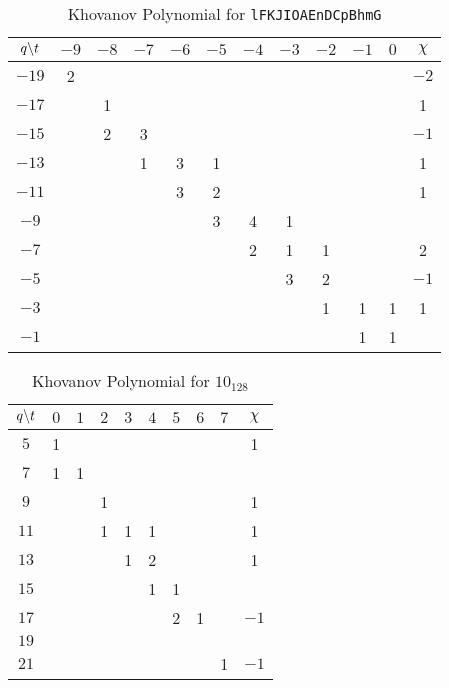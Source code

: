 \begin{table}
    \centering
    \begin{tabular}{| c | c |c | c | c | c | c | c | c | c | c | c |}
        \hline
        $q\symbol{92}t$&$-9$&$-8$&$-7$&$-6$&$-5$&$-4$&$-3$&$-2$&$-1$&$0$&$\chi$\\
        \hline
        $-19$&2&&&&&&&&&&$-2$\\
        \hline
        $-17$&&1&&&&&&&&&1\\
        \hline
        $-15$&&2&3&&&&&&&&$-1$\\
        \hline
        $-13$&&&1&3&1&&&&&&1\\
        \hline
        $-11$&&&&3&2&&&&&&1\\
        \hline
        $-9$&&&&&3&4&1&&&&\\
        \hline
        $-7$&&&&&&2&1&1&&&2\\
        \hline
        $-5$&&&&&&&3&2&&&$-1$\\
        \hline
        $-3$&&&&&&&&1&1&1&1\\
        \hline
        $-1$&&&&&&&&&1&1&\\
        \hline
    \end{tabular}
    \caption{Khovanov Polynomial for \texttt{lFKJIOAEnDCpBhmG}}
\end{table}
\begin{table}
    \centering
    \begin{tabular}{| c | c | c | c | c | c | c | c | c | c |}
        \hline
        $q\symbol{92}t$&$0$&$1$&$2$&$3$&$4$&$5$&$6$&$7$&$\chi$\\
        \hline
        $5$&1&&&&&&&&1\\
        \hline
        $7$&1&1&&&&&&&\\
        \hline
        $9$&&&1&&&&&&1\\
        \hline
        $11$&&&1&1&1&&&&1\\
        \hline
        $13$&&&&1&2&&&&1\\
        \hline
        $15$&&&&&1&1&&&\\
        \hline
        $17$&&&&&&2&1&&$-1$\\
        \hline
        $19$&&&&&&&&&\\
        \hline
        $21$&&&&&&&&1&$-1$\\
        \hline
    \end{tabular}
    \caption{Khovanov Polynomial for $10_{128}$}
\end{table}
